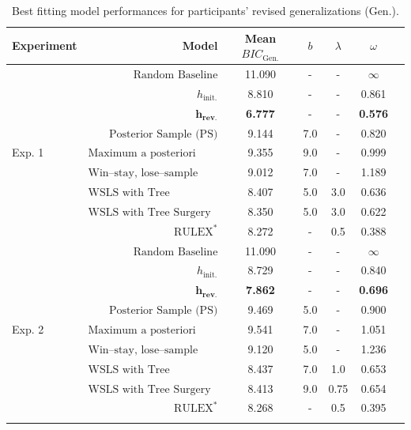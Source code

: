 \documentclass[doc,natbib,floatsintext]{apa7}
\newcommand{\hi}{h_{\mathrm{init.}}}
\begin{document}
\begin{appendices}
\begin{table}[!ht]
\begin{center} 
\caption{Best fitting model performances for participants' revised generalizations (Gen.).} 
\vskip 0.10in
\begin{tabular}{l r c c c c c} 
\small
Experiment & Model & Mean $BIC_{\text{Gen.}}$ & $b$ & $\lambda$ & $\omega$\\ 
\toprule
\multirow{9}{*}{Exp. 1} & $\text{Random Baseline}$ & 11.090 & - & - & $\infty$\\
& $\hi$ & 8.810 & - & - & 0.861\\
& $\mathbf{h}_{\mathrm{\textbf{rev.}}}$ & \textbf{6.777} & - & - & \textbf{0.576}\\
& $\text{Posterior Sample (PS)}$ & 9.144  & 7.0 & - & 0.820\\
& $\text{Maximum a posteriori (MAP)}$ & 9.355  & 9.0 & - & 0.999\\
& $\text{Win--stay, lose--sample (WSLS)}$ & 9.012 & 7.0 & - & 1.189\\
& $\text{WSLS with Tree Regrowth (TR)}$ & 8.407 & 5.0 & 3.0 & 0.636\\
& $\text{WSLS with Tree Surgery (TS)}$ & 8.350 & 5.0 & 3.0 & 0.622\\
& $\text{RULEX}^*$ & 8.272 & - & 0.5 & 0.388\\
\midrule
\multirow{9}{*}{Exp. 2} & $\text{Random Baseline}$ & 11.090 & - & - & $\infty$\\
& $\hi$ & 8.729 & - & - & 0.840\\
& $\mathbf{h}_{\mathrm{\textbf{rev.}}}$ & \textbf{7.862} & - & - & \textbf{0.696}\\
& $\text{Posterior Sample (PS)}$ & 9.469 & 5.0 & - & 0.900\\
& $\text{Maximum a posteriori (MAP)}$ & 9.541 & 7.0 & - & 1.051\\
& $\text{Win--stay, lose--sample (WSLS)}$ & 9.120  & 5.0  & - & 1.236\\
& $\text{WSLS with Tree Regrowth (TR)}$ & 8.437 & 7.0 & 1.0 & 0.653\\
& $\text{WSLS with Tree Surgery (TS)}$ & 8.413  & 9.0 & 0.75 & 0.654\\
& $\text{RULEX}^*$ & 8.268  & - & 0.5 & 0.395\\
\bottomrule
\label{table:table_a8_1_generalizations}
\end{tabular}
\end{center} 
\end{table}


\end{appendices}
\end{document}
